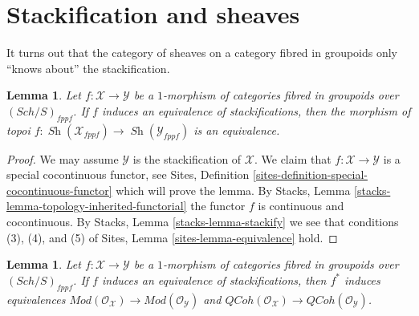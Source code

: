 \documentclass{stacks-project}
\theoremstyle{plain}
\newtheorem{lemma}[subsection]{Lemma}
\theoremstyle{definition}
\theoremstyle{remark}
\numberwithin{equation}{subsection}
\def\Sch{\mathit{Sch}}
\def\Sh{\mathop{\mathit{Sh}}\nolimits}
\def\QCoh{\mathit{QCoh}}
\begin{document}
\section{Stackification and sheaves}
\label{section-stackification}

\noindent
It turns out that the category of sheaves on a category fibred in
groupoids only ``knows about'' the stackification.

\begin{lemma}
\label{lemma-stackification}
Let $f : \mathcal{X} \to \mathcal{Y}$ be a $1$-morphism of categories
fibred in groupoids over $(\Sch/S)_{fppf}$. If
$f$ induces an equivalence of stackifications, then the morphism
of topoi
$f : \Sh(\mathcal{X}_{fppf}) \to \Sh(\mathcal{Y}_{fppf})$
is an equivalence.
\end{lemma}

\begin{proof}
We may assume $\mathcal{Y}$ is the stackification of $\mathcal{X}$.
We claim that $f : \mathcal{X} \to \mathcal{Y}$ is a special cocontinuous
functor, see
Sites, Definition \ref{sites-definition-special-cocontinuous-functor}
which will prove the lemma. By
Stacks, Lemma \ref{stacks-lemma-topology-inherited-functorial}
the functor $f$ is continuous and cocontinuous. By
Stacks, Lemma \ref{stacks-lemma-stackify}
we see that conditions (3), (4), and (5) of
Sites, Lemma \ref{sites-lemma-equivalence}
hold.
\end{proof}

\begin{lemma}
\label{lemma-stackification-quasi-coherent}
Let $f : \mathcal{X} \to \mathcal{Y}$ be a $1$-morphism of categories
fibred in groupoids over $(\Sch/S)_{fppf}$. If
$f$ induces an equivalence of stackifications, then $f^*$
induces equivalences
$\textit{Mod}(\mathcal{O}_\mathcal{X}) \to
\textit{Mod}(\mathcal{O}_\mathcal{Y})$
and
$\QCoh(\mathcal{O}_\mathcal{X}) \to
\QCoh(\mathcal{O}_\mathcal{Y})$.
\end{lemma}
\end{document}
